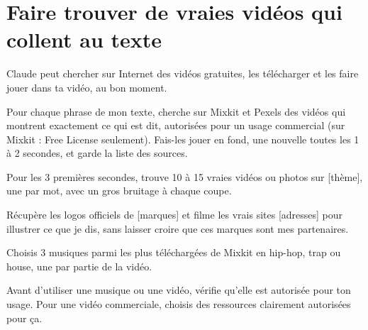 \documentclass[11pt,oneside,openany]{book}
\begin{document}
\section{Faire trouver de vraies vidéos qui collent au texte}
Claude peut chercher sur Internet des vidéos gratuites, les télécharger et les faire jouer dans ta vidéo, au bon moment.
\begin{acopier}
Pour chaque phrase de mon texte, cherche sur Mixkit et Pexels des vidéos qui montrent exactement ce qui est dit, autorisées pour un usage commercial (sur Mixkit : Free License seulement). Fais-les jouer en fond, une nouvelle toutes les 1 à 2 secondes, et garde la liste des sources.
\end{acopier}
\begin{acopier}
Pour les 3 premières secondes, trouve 10 à 15 vraies vidéos ou photos sur [thème], une par mot, avec un gros bruitage à chaque coupe.
\end{acopier}
\begin{acopier}
Récupère les logos officiels de [marques] et filme les vrais sites [adresses] pour illustrer ce que je dis, sans laisser croire que ces marques sont mes partenaires.
\end{acopier}
\begin{acopier}
Choisis 3 musiques parmi les plus téléchargées de Mixkit en hip-hop, trap ou house, une par partie de la vidéo.
\end{acopier}

\begin{attention}
Avant d'utiliser une musique ou une vidéo, vérifie qu'elle est autorisée pour ton usage. Pour une vidéo commerciale, choisis des ressources clairement autorisées pour ça.
\end{attention}
\end{document}
